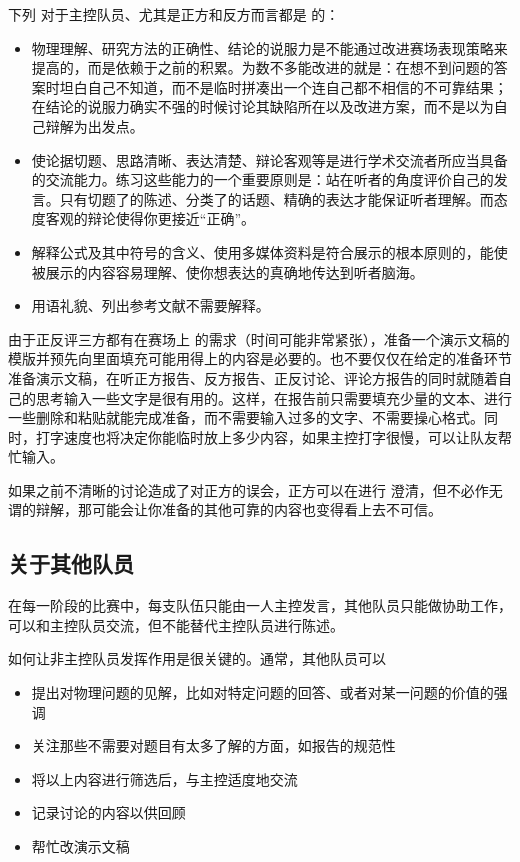 \documentclass[a4paper,10pt,english]{sphinxmanual}
\begin{document}
下列  对于主控队员、尤其是正方和反方而言都是  的：
\begin{itemize}
\item {} 
物理理解、研究方法的正确性、结论的说服力是不能通过改进赛场表现策略来提高的，而是依赖于之前的积累。为数不多能改进的就是：在想不到问题的答案时坦白自己不知道，而不是临时拼凑出一个连自己都不相信的不可靠结果；在结论的说服力确实不强的时候讨论其缺陷所在以及改进方案，而不是以为自己辩解为出发点。

\item {} 
使论据切题、思路清晰、表达清楚、辩论客观等是进行学术交流者所应当具备的交流能力。练习这些能力的一个重要原则是：站在听者的角度评价自己的发言。只有切题了的陈述、分类了的话题、精确的表达才能保证听者理解。而态度客观的辩论使得你更接近“正确”。

\item {} 
解释公式及其中符号的含义、使用多媒体资料是符合展示的根本原则的，能使被展示的内容容易理解、使你想表达的真确地传达到听者脑海。

\item {} 
用语礼貌、列出参考文献不需要解释。

\end{itemize}

由于正反评三方都有在赛场上  的需求（时间可能非常紧张），准备一个演示文稿的模版并预先向里面填充可能用得上的内容是必要的。也不要仅仅在给定的准备环节准备演示文稿，在听正方报告、反方报告、正反讨论、评论方报告的同时就随着自己的思考输入一些文字是很有用的。这样，在报告前只需要填充少量的文本、进行一些删除和粘贴就能完成准备，而不需要输入过多的文字、不需要操心格式。同时，打字速度也将决定你能临时放上多少内容，如果主控打字很慢，可以让队友帮忙输入。

如果之前不清晰的讨论造成了对正方的误会，正方可以在进行  澄清，但不必作无谓的辩解，那可能会让你准备的其他可靠的内容也变得看上去不可信。


\subsection{关于其他队员}
\label{\detokenize{6. Tournament:id7}}
在每一阶段的比赛中，每支队伍只能由一人主控发言，其他队员只能做协助工作，可以和主控队员交流，但不能替代主控队员进行陈述。

如何让非主控队员发挥作用是很关键的。通常，其他队员可以
\begin{itemize}
\item {} 
提出对物理问题的见解，比如对特定问题的回答、或者对某一问题的价值的强调

\item {} 
关注那些不需要对题目有太多了解的方面，如报告的规范性

\item {} 
将以上内容进行筛选后，与主控适度地交流

\item {} 
记录讨论的内容以供回顾

\item {} 
帮忙改演示文稿

\end{itemize}
\end{document}
